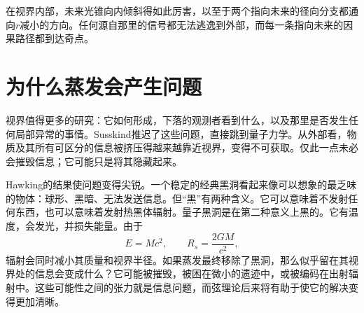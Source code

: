 在视界内部，未来光锥向内倾斜得如此厉害，以至于两个指向未来的径向分支都通向\(r\)减小的方向。任何源自那里的信号都无法逃逸到外部，而每一条指向未来的因果路径都到达奇点。

\begin{classroomqa}
\end{classroomqa}

\begin{classroomqa}
\end{classroomqa}

\begin{classroomqa}
\end{classroomqa}

\section{为什么蒸发会产生问题}

视界值得更多的研究：它如何形成，下落的观测者看到什么，以及那里是否发生任何局部异常的事情。Susskind推迟了这些问题，直接跳到量子力学。从外部看，物质及其所有可区分的信息被挤压得越来越靠近视界，变得不可获取。仅此一点未必会摧毁信息；它可能只是将其隐藏起来。

Hawking的结果使问题变得尖锐。一个稳定的经典黑洞看起来像可以想象的最乏味的物体：球形、黑暗、无法发送信息。但``黑''有两种含义。它可以意味着不发射任何东西，也可以意味着发射热黑体辐射。量子黑洞是在第二种意义上黑的。它有温度，会发光，并损失能量。由于
\begin{equation}
E=Mc^2,
\qquad
R_s=\frac{2GM}{c^2},
\end{equation}
辐射会同时减小其质量和视界半径。如果蒸发最终移除了黑洞，那么似乎留在其视界处的信息会变成什么？它可能被摧毁，被困在微小的遗迹中，或被编码在出射辐射中。这些可能性之间的张力就是信息问题，而弦理论后来将有助于使它的解决变得更加清晰。

